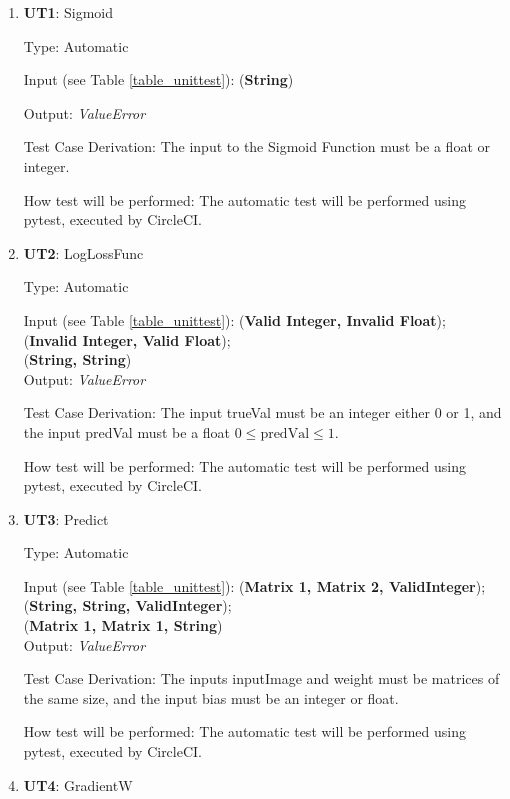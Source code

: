 \documentclass[12pt, titlepage]{article}
\begin{document}
\begin{enumerate}

\item{\textbf{UT1}: Sigmoid}

Type: Automatic
					
Input (see Table \ref{table_unittest}): (\textbf{String})
					
Output: \textit{ValueError}

Test Case Derivation: The input to the Sigmoid Function must be a float or integer.

How test will be performed: The automatic test will be performed using pytest, executed by CircleCI.


\item{\textbf{UT2}: LogLossFunc}

Type: Automatic
					
Input (see Table \ref{table_unittest}): (\textbf{Valid Integer, Invalid Float});\\
(\textbf{Invalid Integer, Valid Float});\\
(\textbf{String, String})\\
					
Output: \textit{ValueError}

Test Case Derivation: The input trueVal must be an integer either 0 or 1, and the input predVal must be a float $0 \leq \text{predVal} \leq 1$.

How test will be performed: The automatic test will be performed using pytest, executed by CircleCI.

\item{\textbf{UT3}: Predict}

Type: Automatic
					
Input (see Table \ref{table_unittest}): (\textbf{Matrix 1, Matrix 2, ValidInteger});\\
(\textbf{String, String, ValidInteger});\\
(\textbf{Matrix 1, Matrix 1, String})\\
					
Output: \textit{ValueError}

Test Case Derivation: The inputs inputImage and weight must be matrices of the same size, and the input bias must be an integer or float.

How test will be performed: The automatic test will be performed using pytest, executed by CircleCI.

\item{\textbf{UT4}: GradientW}


\end{enumerate}
\end{document}
